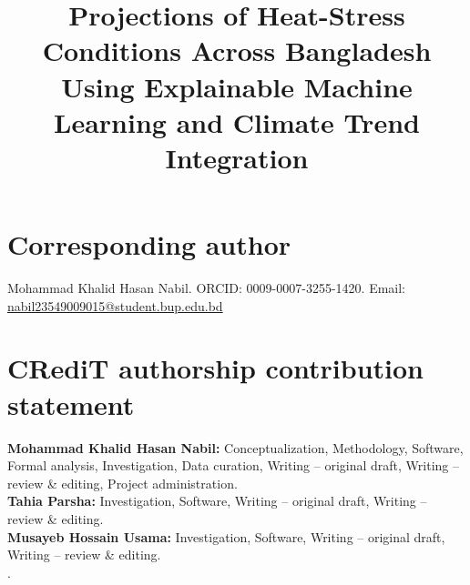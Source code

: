 \documentclass[pdflatex,sn-basic]{sn-jnl}
\begin{document}
\title{Projections of Heat-Stress Conditions Across Bangladesh Using Explainable Machine Learning and Climate Trend Integration}

\author*[1]{ }

\author[1]{ }

\author[1]{ }

\author[1]{ }

\author[2]{ }




\maketitle

\section*{Corresponding author}
Mohammad Khalid Hasan Nabil. ORCID: 0009-0007-3255-1420.
Email: \url{nabil23549009015@student.bup.edu.bd}

\section*{CRediT authorship contribution statement}
\noindent\textbf{Mohammad Khalid Hasan Nabil:} Conceptualization, Methodology, Software, Formal analysis, Investigation, Data curation, Writing -- original
draft, Writing -- review \& editing, Project administration.\\[2pt]
\textbf{Tahia Parsha:} Investigation, Software, Writing -- original draft, Writing -- review \& editing.\\[2pt]
\textbf{Musayeb Hossain Usama:} Investigation, Software, Writing -- original draft, Writing -- review \& editing.\\[2pt].
\end{document}
